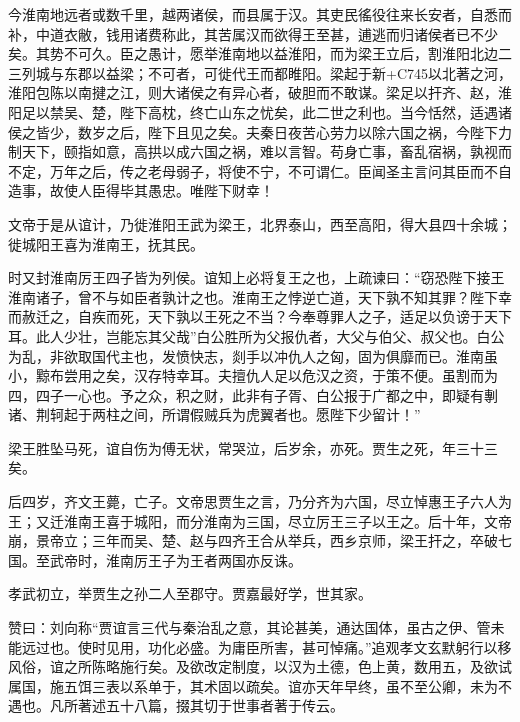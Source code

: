 \documentclass[12pt,UTF8]{ctexbook}
\begin{document}
今淮南地远者或数千里，越两诸侯，而县属于汉。其吏民徭役往来长安者，自悉而补，中道衣敝，钱用诸费称此，其苦属汉而欲得王至甚，逋逃而归诸侯者已不少矣。其势不可久。臣之愚计，愿举淮南地以益淮阳，而为梁王立后，割淮阳北边二三列城与东郡以益梁；不可者，可徙代王而都睢阳。梁起于新+C745以北著之河，淮阳包陈以南揵之江，则大诸侯之有异心者，破胆而不敢谋。梁足以扞齐、赵，淮阳足以禁吴、楚，陛下高枕，终亡山东之忧矣，此二世之利也。当今恬然，适遇诸侯之皆少，数岁之后，陛下且见之矣。夫秦日夜苦心劳力以除六国之祸，今陛下力制天下，颐指如意，高拱以成六国之祸，难以言智。苟身亡事，畜乱宿祸，孰视而不定，万年之后，传之老母弱子，将使不宁，不可谓仁。臣闻圣主言问其臣而不自造事，故使人臣得毕其愚忠。唯陛下财幸！



文帝于是从谊计，乃徙淮阳王武为梁王，北界泰山，西至高阳，得大县四十余城；徙城阳王喜为淮南王，抚其民。



时又封淮南厉王四子皆为列侯。谊知上必将复王之也，上疏谏曰：“窃恐陛下接王淮南诸子，曾不与如臣者孰计之也。淮南王之悖逆亡道，天下孰不知其罪？陛下幸而赦迁之，自疾而死，天下孰以王死之不当？今奉尊罪人之子，适足以负谤于天下耳。此人少壮，岂能忘其父哉”白公胜所为父报仇者，大父与伯父、叔父也。白公为乱，非欲取国代主也，发愤快志，剡手以冲仇人之匈，固为俱靡而已。淮南虽小，黥布尝用之矣，汉存特幸耳。夫擅仇人足以危汉之资，于策不便。虽割而为四，四子一心也。予之众，积之财，此非有子胥、白公报于广都之中，即疑有剸诸、荆轲起于两柱之间，所谓假贼兵为虎翼者也。愿陛下少留计！”



梁王胜坠马死，谊自伤为傅无状，常哭泣，后岁余，亦死。贾生之死，年三十三矣。



后四岁，齐文王薨，亡子。文帝思贾生之言，乃分齐为六国，尽立悼惠王子六人为王；又迁淮南王喜于城阳，而分淮南为三国，尽立厉王三子以王之。后十年，文帝崩，景帝立；三年而吴、楚、赵与四齐王合从举兵，西乡京师，梁王扞之，卒破七国。至武帝时，淮南厉王子为王者两国亦反诛。



孝武初立，举贾生之孙二人至郡守。贾嘉最好学，世其家。



赞曰：刘向称“贾谊言三代与秦治乱之意，其论甚美，通达国体，虽古之伊、管未能远过也。使时见用，功化必盛。为庸臣所害，甚可悼痛。”追观孝文玄默躬行以移风俗，谊之所陈略施行矣。及欲改定制度，以汉为土德，色上黄，数用五，及欲试属国，施五饵三表以系单于，其术固以疏矣。谊亦天年早终，虽不至公卿，未为不遇也。凡所著述五十八篇，掇其切于世事者著于传云。
\end{document}
